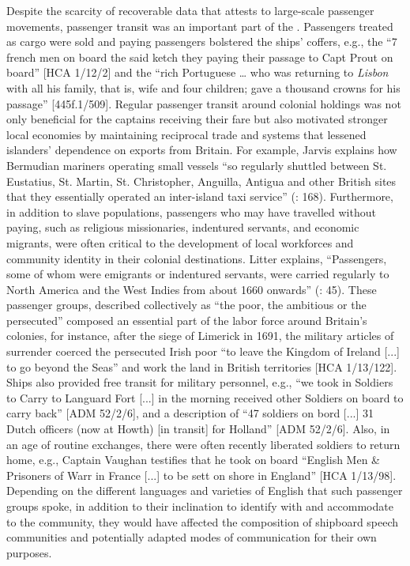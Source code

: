 Despite the scarcity of recoverable data that attests to large-scale passenger movements, passenger transit was an important part of the . Passengers treated as cargo were sold and paying passengers bolstered the ships’ coffers, e.g., the “7 french men on board the said ketch they paying their passage to Capt Prout on board” [HCA 1/12/2] and the “rich Portuguese … who was returning to \textit{Lisbon} with all his family, that is, wife and four children; gave a thousand crowns for his passage” [445f.1/509]. Regular passenger transit around colonial holdings was not only beneficial for the captains receiving their fare but also motivated stronger local economies by maintaining reciprocal trade and  systems that lessened islanders’ dependence on exports from Britain. For example, Jarvis explains how Bermudian mariners operating small vessels “so regularly shuttled between St. Eustatius, St. Martin, St. Christopher, Anguilla, Antigua and other British sites that they essentially operated an inter-island taxi service” (\citealt{Jarvis2010}: 168). Furthermore, in addition to slave populations, passengers who may have travelled without paying, such as religious missionaries, indentured servants, and economic migrants, were often critical to the development of local workforces and community identity in their colonial destinations. Litter explains, “Passengers, some of whom were emigrants or indentured servants, were carried regularly to North America and the West Indies from about 1660 onwards”  (\citealt{Litter1999}: 45). These passenger groups, described collectively as “the poor, the ambitious or the persecuted” \citep[45]{Litter1999} composed an essential part of the labor force around Britain's colonies, for instance, after the siege of Limerick in 1691, the military articles of surrender coerced the persecuted Irish poor “to leave the Kingdom of Ireland [...] to go beyond the Seas” and work the land in British territories [HCA 1/13/122]. Ships also provided free transit for military personnel, e.g., “we took in Soldiers to Carry to Languard Fort [...] in the morning received other Soldiers on board to carry back” [ADM 52/2/6], and a description of “47 soldiers on bord [...] 31 Dutch officers (now at Howth) [in transit] for Holland” [ADM 52/2/6]. Also, in an age of routine  exchanges, there were often recently liberated soldiers to return home, e.g., Captain Vaughan testifies that he took on board “English Men \& Prisoners of Warr in France [...] to be sett on shore in England” [HCA 1/13/98]. Depending on the different languages and varieties of English that such passenger groups spoke, in addition to their inclination to identify with and accommodate to the  community, they would have affected the composition of shipboard speech communities and potentially adapted modes of communication for their own purposes. 

